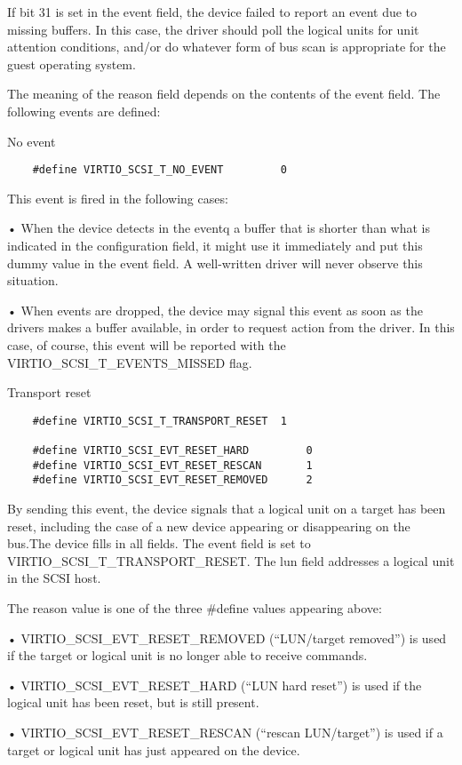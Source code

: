 If bit 31 is set in the event field, the device failed to report
an event due to missing buffers. In this case, the driver should
poll the logical units for unit attention conditions, and/or do
whatever form of bus scan is appropriate for the guest operating
system.

The meaning of the reason field depends on the
contents of the event field. The following events are defined:

  No event
\begin{lstlisting}
	#define VIRTIO_SCSI_T_NO_EVENT         0
\end{lstlisting}

  This event is fired in the following cases:

  • When the device detects in the eventq a buffer that is
    shorter than what is indicated in the configuration field, it
    might use it immediately and put this dummy value in the
    event field. A well-written driver will never observe this
    situation.

  • When events are dropped, the device may signal this event as
    soon as the drivers makes a buffer available, in order to
    request action from the driver. In this case, of course, this
    event will be reported with the VIRTIO_SCSI_T_EVENTS_MISSED
    flag.

  Transport reset
\begin{lstlisting}
	#define VIRTIO_SCSI_T_TRANSPORT_RESET  1

	#define VIRTIO_SCSI_EVT_RESET_HARD         0
	#define VIRTIO_SCSI_EVT_RESET_RESCAN       1
	#define VIRTIO_SCSI_EVT_RESET_REMOVED      2
\end{lstlisting}

  By sending this event, the device signals that a logical unit
  on a target has been reset, including the case of a new device
  appearing or disappearing on the bus.The device fills in all
  fields. The event field is set to
  VIRTIO_SCSI_T_TRANSPORT_RESET. The lun field addresses a
  logical unit in the SCSI host.

  The reason value is one of the three \#define values appearing
  above:

  • VIRTIO_SCSI_EVT_RESET_REMOVED (“LUN/target removed”) is used
    if the target or logical unit is no longer able to receive
    commands.

  • VIRTIO_SCSI_EVT_RESET_HARD (“LUN hard reset”) is used if the
    logical unit has been reset, but is still present.

  • VIRTIO_SCSI_EVT_RESET_RESCAN (“rescan LUN/target”) is used if
    a target or logical unit has just appeared on the device.

